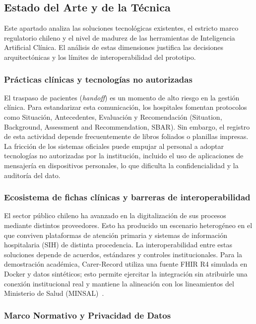 \subsection{Estado del Arte y de la Técnica}

Este apartado analiza las soluciones tecnológicas existentes, el estricto marco regulatorio chileno y el nivel de madurez de las herramientas de Inteligencia Artificial Clínica. El análisis de estas dimensiones justifica las decisiones arquitectónicas y los límites de interoperabilidad del prototipo.

\subsubsection{Prácticas clínicas y tecnologías no autorizadas}

 El traspaso de pacientes (\textit{handoff}) es un momento de alto riesgo en la gestión clínica. Para estandarizar esta comunicación, los hospitales fomentan protocolos como Situación, Antecedentes, Evaluación y Recomendación (Situation, Background, Assessment and Recommendation, SBAR). Sin embargo, el registro de esta actividad depende frecuentemente de libros foliados o planillas impresas. La fricción de los sistemas oficiales puede empujar al personal a adoptar tecnologías no autorizadas por la institución, incluido el uso de aplicaciones de mensajería en dispositivos personales, lo que dificulta la confidencialidad y la auditoría del dato.

\subsubsection{Ecosistema de fichas clínicas y barreras de interoperabilidad}

El sector público chileno ha avanzado en la digitalización de sus procesos mediante distintos proveedores. Esto ha producido un escenario heterogéneo en el que conviven plataformas de atención primaria y sistemas de información hospitalaria (SIH) de distinta procedencia. La interoperabilidad entre estas soluciones depende de acuerdos, estándares y controles institucionales. Para la demostración académica, Carer-Record utiliza una fuente FHIR R4 simulada en Docker y datos sintéticos; esto permite ejercitar la integración sin atribuirle una conexión institucional real y mantiene la alineación con los lineamientos del Ministerio de Salud (MINSAL)~\cite{minsal_estandares_perfiles}.

\subsubsection{Marco Normativo y Privacidad de Datos}

